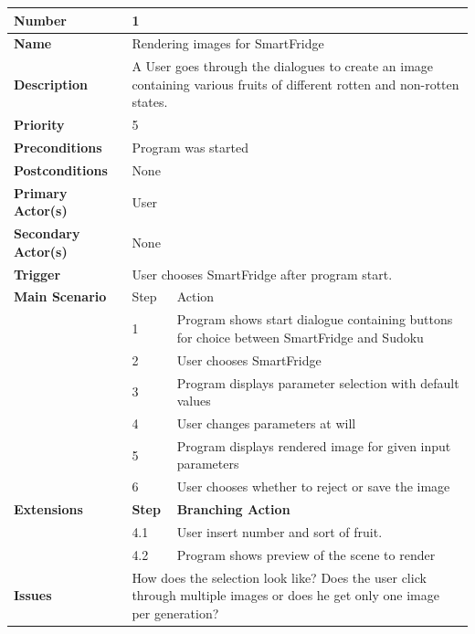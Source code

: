 \documentclass[a4paper,12pt]{article}
\begin{document}
\begin{tabularx}{\linewidth}{|l|l|X|}
\hline
\textbf{Number} & \multicolumn{2}{l|}{1} \\
\hline
\textbf{Name} & \multicolumn{2}{l|}{Rendering images for SmartFridge} \\
\hline
\textbf{Description} &  \multicolumn{2}{X|}{A User goes through the dialogues to create an image containing various fruits of different rotten and non-rotten states.} \\
\hline
\textbf{Priority} & \multicolumn{2}{l|}{5} \\
\hline
\textbf{Preconditions} & \multicolumn{2}{l|}{Program was started} \\
\hline
\textbf{Postconditions} & \multicolumn{2}{l|}{None} \\
\hline
\textbf{Primary Actor(s)} & \multicolumn{2}{l|}{User} \\
\hline
\textbf{Secondary Actor(s)} & \multicolumn{2}{l|}{None} \\
\hline
\textbf{Trigger} & \multicolumn{2}{l|}{User chooses SmartFridge after program start.} \\
\hline
\textbf{Main Scenario} & Step & Action\\
\hline
 & 1 & Program shows start dialogue containing buttons for choice between SmartFridge and Sudoku\\
\cline{2-3}
 & 2 & User chooses SmartFridge\\
\cline{2-3}
 & 3 & Program displays parameter selection with default values\\
\cline{2-3}
 & 4 & User changes parameters at will \\
\cline{2-3}
 & 5 & Program displays rendered image for given input parameters \\
\cline{2-3}
 & 6 & User chooses whether to reject or save the image \\
\hline
\textbf{Extensions} & \textbf{Step} & \textbf{Branching Action} \\
\hline
& 4.1 & User insert number and sort of fruit. \\
\cline{2-3}
& 4.2 & Program shows preview of the scene to render \\
\hline
\textbf{Issues} & \multicolumn{2}{X|}{How does the selection look like? Does the user click through multiple images or does he get only one image per generation?} \\
\hline
\end{tabularx}
 \\
 \\
\end{document}
